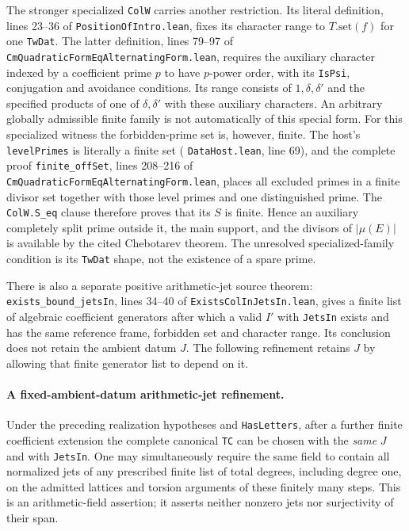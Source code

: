 \documentclass[11pt]{article}
\theoremstyle{definition}\newtheorem{definition}[theorem]{Definition}\newtheorem{remark}[theorem]{Remark}
\begin{document}
The stronger specialized \texttt{ColW} carries another
restriction.  Its literal definition, lines 23--36 of
\texttt{PositionOfIntro.lean}, fixes its character range
to $T.\mathrm{set}(f)$ for one \texttt{TwDat}.
The latter definition, lines 79--97 of
\nolinkurl{CmQuadraticFormEqAlternatingForm.lean}, requires
the auxiliary character indexed by a coefficient prime
$p$ to have $p$-power order, with its \texttt{IsPsi},
conjugation and avoidance conditions.  Its range consists
of $1,\delta,\delta'$ and the specified products of
one of $\delta,\delta'$ with these auxiliary characters.
An arbitrary globally admissible finite family is not
automatically of this special form.
For this specialized witness the forbidden-prime set is,
however, finite.  The host's \texttt{levelPrimes} is
literally a finite set (
\texttt{DataHost.lean}, line 69), and the complete proof
\texttt{finite\_offSet}, lines 208--216 of
\nolinkurl{CmQuadraticFormEqAlternatingForm.lean}, places
all excluded primes in a finite divisor set together
with those level primes and one distinguished prime.
The \texttt{ColW.S\_eq} clause therefore proves that
its $S$ is finite.  Hence an auxiliary completely split
prime outside it, the main support, and the divisors of
$|\mu(E)|$ is available by the cited Chebotarev theorem.
The unresolved specialized-family condition is its
\texttt{TwDat} shape, not the existence of a spare prime.

There is also a separate positive arithmetic-jet source
theorem: \texttt{exists\_bound\_jetsIn}, lines 34--40
of \nolinkurl{ExistsColInJetsIn.lean}, gives a finite list
of algebraic coefficient generators after which a valid
$I'$ with \texttt{JetsIn} exists and has the same
reference frame, forbidden set and character range.
Its conclusion does not retain the ambient datum $J$.
The following refinement retains $J$ by allowing that
finite generator list to depend on it.

\paragraph{A fixed-ambient-datum arithmetic-jet refinement.}
Under the preceding realization hypotheses and
\texttt{HasLetters}, after a further finite coefficient
extension the complete canonical \texttt{TC} can be
chosen with the \emph{same} $J$ and with
\texttt{JetsIn}.  One may simultaneously require the
same field to contain all normalized jets of any
prescribed finite list of total degrees, including
degree one, on the admitted lattices and torsion
arguments of these finitely many steps.  This is
an arithmetic-field assertion; it asserts neither
nonzero jets nor surjectivity of their span.
\end{document}
